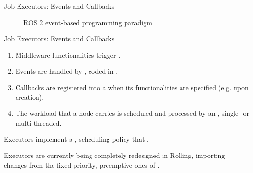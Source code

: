 \begin{frame}{Job Executors: Events and Callbacks}
	\begin{figure}
		\centering
		
		\label{fig:executorscheme}
		\caption{ROS 2 event-based programming paradigm}
	\end{figure}
\end{frame}
\begin{frame}{Job Executors: Events and Callbacks}
	\begin{enumerate}
		\item Middleware functionalities trigger .
		\item Events are handled by , coded in .
		\item Callbacks are registered into a  when its functionalities are specified (e.g. upon creation).
		\item The workload that a node carries is scheduled and processed by an , single- or multi-threaded.
	\end{enumerate}
	\begin{alertblock}{}
		Executors implement a ,  scheduling policy that .
	\end{alertblock}
	Executors are currently being completely redesigned in Rolling, importing changes from the fixed-priority, preemptive ones of .
\end{frame}
